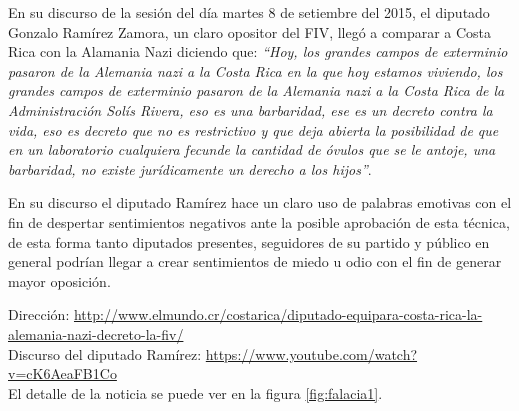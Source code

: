 \documentclass[times]{simauth}
\begin{document}
En su discurso de la sesión del día martes 8 de setiembre del 2015, el diputado Gonzalo Ramírez Zamora, un claro opositor del FIV, llegó a comparar a Costa Rica con la Alamania Nazi diciendo que: \textit{``Hoy, los grandes campos de exterminio pasaron de la Alemania nazi a la Costa Rica en la que hoy estamos viviendo, los grandes campos de exterminio pasaron de la Alemania nazi a la Costa Rica de la Administración Solís Rivera, eso es una barbaridad, ese es un decreto contra la vida, eso es decreto que no es restrictivo y que deja abierta la posibilidad de que en un laboratorio cualquiera fecunde la cantidad de óvulos que se le antoje, una barbaridad, no existe jurídicamente un derecho a los hijos''}.

En su discurso el diputado Ramírez hace un claro uso de palabras emotivas con el fin de despertar sentimientos negativos ante la posible aprobación de esta técnica, de esta forma tanto diputados presentes, seguidores de su partido y público en general podrían llegar a crear sentimientos de miedo u odio con el fin de generar mayor oposición.


\noindent Dirección: \href{http://www.elmundo.cr/costarica/diputado-equipara-costa-rica-la-alemania-nazi-decreto-la-fiv/}{http://www.elmundo.cr/costarica/diputado-equipara-costa-rica-la-alemania-nazi-decreto-la-fiv/} \\
Discurso del diputado Ramírez: \href{https://www.youtube.com/watch?v=cK6AeaFB1Co}{https://www.youtube.com/watch?v=cK6AeaFB1Co}\\
El detalle de la noticia se puede ver en la figura \ref{fig:falacia1}.
\end{document}
